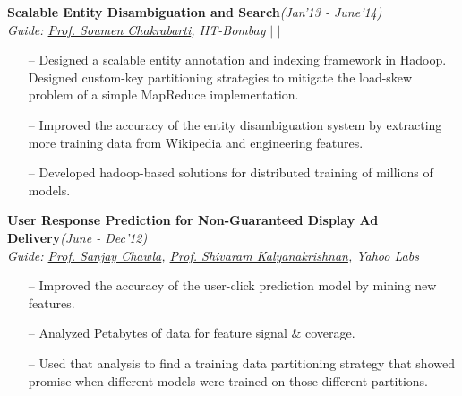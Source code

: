 \documentclass[margin,line]{templates/resume}
\newcommand{\myhref}[3][blue]{\href{#2}{\color{#1}{#3}}}
\newcommand{\compresslist}{%
\setlength{\itemsep}{3pt}%
\setlength{\parskip}{0pt}%
\setlength{\parsep}{0pt}%
}
\begin{document}
\begin{resume}
\vspace{-0.2cm}    
\textsf{\textbf{Scalable Entity Disambiguation and Search}}\hfill\textit{\small(Jan'13 - June'14)}
\\ {\textit{Guide: \href{https://www.cse.iitb.ac.in/~soumen/}{Prof. Soumen Chakrabarti}, IIT-Bombay}}\hfill{\myhref[darkblue]{https://shatu.github.io/\#iitb}{Web} $|$ \myhref[darkblue]{https://github.com/shatu/shatu.github.io/blob/master/papers/Web-scale_Entity_Annotation_Using_MapReduce.pdf}{Publication} $|$ \myhref[darkblue]{https://www.cse.iitb.ac.in/~soumen/doc/CSAW/}{CSAW}}
\vspace{0.05cm}
\begin{itemize}[leftmargin=*]\compresslist
    \item[--]Designed a scalable entity annotation and indexing framework in Hadoop. Designed custom-key partitioning strategies to mitigate the load-skew problem of a simple MapReduce implementation.
    \item[--]Improved the accuracy of the entity disambiguation system by extracting more training data from Wikipedia and engineering features.
    \item[--]Developed hadoop-based solutions for distributed training of millions of models. 
\end{itemize}

\vspace{-0.2cm}
\textsf{\textbf{User Response Prediction for Non-Guaranteed Display Ad Delivery}}\hfill\textit{\small(June - Dec'12)}
\\ {\textit{Guide: \href{http://www.pmg.it.usyd.edu.au/}{Prof. Sanjay Chawla}, \href{https://www.cse.iitb.ac.in/~shivaram/}{Prof. Shivaram Kalyanakrishnan}, Yahoo Labs}} \hfill{\myhref[darkblue]{https://shatu.github.io/\#labs}{Web}}
\normalsize
\vspace{0.05cm}
\begin{itemize}[leftmargin=*]\compresslist
    \item[--]Improved the accuracy of the user-click prediction model by mining new features. 
    \item[--]Analyzed Petabytes of data for feature signal \& coverage.
    \item[--]Used that analysis to find a training data partitioning strategy that showed promise when different models were trained on those different partitions.
\end{itemize}


\end{resume}
\end{document}
